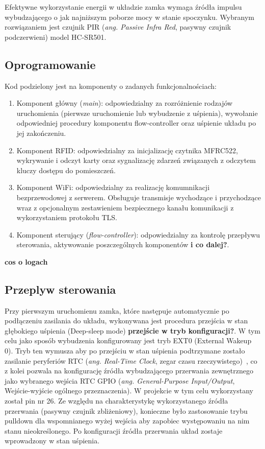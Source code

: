                 Efektywne wykorzystanie energii w układzie zamka wymaga źródła impulsu wybudzającego o jak najniższym poborze mocy w stanie spoczynku. Wybranym rozwiązaniem jest czujnik PIR (\textit{ang. Passive Infra Red}, pasywny czujnik podczerwieni) model HC-SR501.

        \subsection{Oprogramowanie}

            Kod podzielony jest na komponenty o zadanych funkcjonalnościach:
            \begin{enumerate}
                \item Komponent główny (\textit{main}): odpowiedzialny za rozróżnienie rodzajów uruchomienia (pierwsze uruchomienie lub wybudzenie z uśpienia), wywołanie odpowiedniej procedury komponentu flow-controller oraz uśpienie układu po jej zakończeniu.
                \item Komponent RFID: odpowiedzialny za inicjalizację czytnika MFRC522, wykrywanie i odczyt karty oraz sygnalizację zdarzeń związanych z odczytem kluczy dostępu do pomieszczeń.
                \item Komponent WiFi: odpowiedzialny za realizację komumnikacji bezprzewodowej z serwerem. Obsługuje transmisje wychodzące i przychodzące wraz z opcjonalnym zestawieniem bezpiecznego kanału komunikacji z wykorzystaniem protokołu TLS.
                \item Komponent sterujący (\textit{flow-controller}): odpowiedzialny za kontrolę przepływu sterowania, aktywowanie poszczególnych komponentów \textbf{i co dalej?}.
            \end{enumerate}
            \textbf{cos o logach}

        \subsection{Przeplyw sterowania}
            Przy pierwszym uruchomienu zamka, które następuje automatycznie po podłączeniu zasilania do układu, wykonywana jest procedura przejścia w stan głębokiego uśpienia (Deep-sleep mode) \textbf{przejście w tryb konfiguracji?}. W tym celu jako sposób wybudzenia konfigurowany jest tryb EXT0 (External Wakeup 0). Tryb ten wymusza aby po przejściu w stan uśpienia podtrzymane zostało zasilanie peryferiów RTC (\textit{ang. Real-Time Clock}, zegar czasu rzeczywistego)~\cite{esp32-api-ref-deep-sleep}, co z kolei pozwala na konfigurację źródła wybudzającego przerwania zewnętrznego jako wybranego wejścia RTC GPIO (\textit{ang. General-Purpose Input/Output}, Wejście-wyjście ogólnego przeznaczenia). W projekcie w tym celu wykorzystany został pin nr 26. Ze względu na charakterystykę wykorzystanego źródła przerwania (pasywny czujnik zbliżeniowy), konieczne było zastosowanie trybu pulldown dla wspomnianego wyżej wejścia aby zapobiec występowaniu na nim stanu nieokreślonego. Po konfiguracji źródła przerwania układ zostaje wprowadzony w stan uśpienia.


